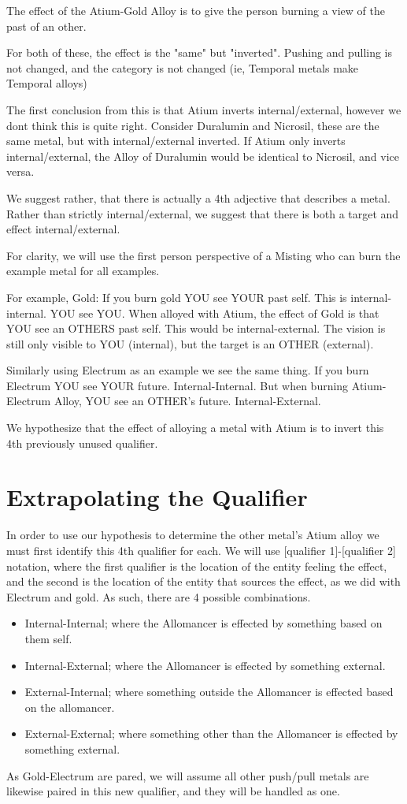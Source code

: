 \documentclass[conference]{IEEEtran}
\begin{document}
The effect of the Atium-Gold Alloy is to give the person burning a view of the past of an other.

For both of these, the effect is the "same" but "inverted". Pushing and pulling is not changed, and the category is not changed (ie, Temporal metals make Temporal alloys)

The first conclusion from this is that Atium inverts internal/external, however we dont think this is quite right.  Consider Duralumin and Nicrosil, these are the same metal, but with internal/external inverted.  If Atium only inverts internal/external, the Alloy of Duralumin would be identical to Nicrosil, and vice versa.

We suggest rather, that there is actually a 4th adjective that describes a metal.  Rather than strictly internal/external, we suggest that there is both a target and effect internal/external.

For clarity, we will use the first person perspective of a Misting who can burn the example metal for all examples.

For example, Gold: If you burn gold YOU see YOUR past self.  This is internal-internal.  YOU see YOU.  When alloyed with Atium, the effect of Gold is that YOU see an OTHERS past self.  This would be internal-external.  The vision is still only visible to YOU (internal), but the target is an OTHER (external).

Similarly using Electrum as an example we see the same thing.  If you burn Electrum YOU see YOUR future.  Internal-Internal.  But when burning Atium-Electrum Alloy, YOU see an OTHER's future.  Internal-External.

We hypothesize that the effect of alloying a metal with Atium is to invert this 4th previously unused qualifier.

\section*{Extrapolating the Qualifier}
In order to use our hypothesis to determine the other metal's Atium alloy we must first identify this 4th qualifier for each.
We will use [qualifier 1]-[qualifier 2] notation, where the first qualifier is the location of the entity feeling the effect, and the second is the location of the entity that sources the effect, as we did with Electrum and gold.  As such, there are 4 possible combinations.  
\begin{itemize}
\item Internal-Internal; where the Allomancer is effected by something based on them self.
\item Internal-External; where the Allomancer is effected by something external.
\item External-Internal; where something outside the Allomancer is effected based on the allomancer.
\item External-External; where something other than the Allomancer is effected by something external.
\end{itemize}
As Gold-Electrum are pared, we will assume all other push/pull metals are likewise paired in this new qualifier, and they will be handled as one.
\end{document}
